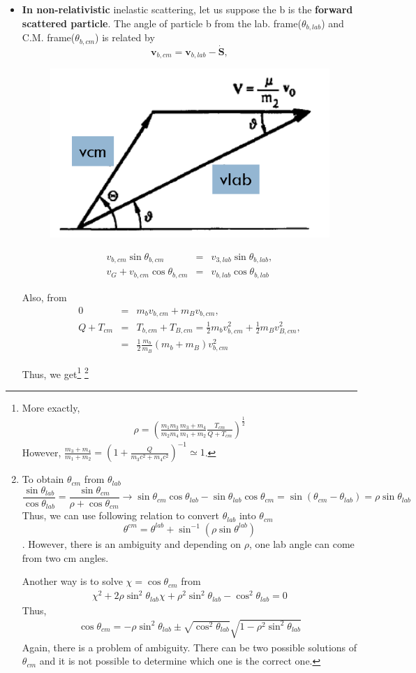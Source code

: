 \documentclass[10pt]{book}
\def\bm{\boldsymbol}
\newcommand{\bea}{\begin{eqnarray}}
\newcommand{\eea}{\end{eqnarray}}
\newcommand{\no}{\nonumber \\}
\begin{document}
\begin{itemize}
\item 
{\bf In non-relativistic} inelastic scattering, 
let us suppose the b is the {\bf forward scattered particle}. 
The angle of particle b from the lab. frame($\theta_{b,lab}$) 
and C.M. frame($\theta_{b,cm}$) is related by
$${\bm v}_{b,cm}={\bm v}_{b,lab}-\dot{\bm S}, $$
\begin{figure}
\centering
\includegraphics[width=0.5\linewidth]{labcm}
\caption{}
\label{fig:labcm}
\end{figure}

\bea 
v_{b,cm}\sin\theta_{b,cm}&=& v_{3,lab}\sin\theta_{b,lab} ,\no 
v_G+v_{b,cm}\cos\theta_{b,cm}&=&v_{b,lab}\cos\theta_{b,lab}
\eea 


Also, from
\bea 
 0&=& m_b v_{b,cm}+m_B v_{b,cm}, \no 
Q+T_{cm}&=&T_{b,cm}+T_{B,cm}=\frac{1}{2}m_b v_{b,cm}^2+\frac{1}{2}m_B v_{B,cm}^2,\no 
        &=& \frac{1}{2}\frac{m_b}{m_B}(m_b+m_B)v_{b,cm}^2
\eea 

Thus, we get\footnote{More exactly,
\bea 
\rho= \left(\frac{m_1 m_3}{m_2 m_4}\frac{m_3+m_4}{m_1+m_2}
        \frac{T_{cm}}{Q+T_{cm}}\right)^{\frac{1}{2}}
\eea 
However, $\frac{m_3+m_4}{m_1+m_2}=(1+\frac{Q}{m_3c^2+m_4c^2})^{-1}\simeq 1$.
}
\footnote{To obtain $\theta_{cm}$ from $\theta_{lab}$ 
	$$
	\frac{\sin\theta_{lab}}{\cos\theta_{lab}}=\frac{\sin\theta_{cm}}{\rho+\cos\theta_{cm}}
	\to \sin\theta_{cm}\cos\theta_{lab}-\sin\theta_{lab}\cos\theta_{cm}
	=\sin(\theta_{cm}-\theta_{lab})= 
	\rho\sin\theta_{lab} 
	$$
	Thus, we can use following relation to convert $\theta_{lab}$ into $\theta_{cm}$
	$$\theta^{cm}=\theta^{lab}+\sin^{-1}(\rho \sin\theta^{lab}) $$. 
	However, there is an ambiguity and depending on $\rho$, one lab angle can come from two cm angles. 
	
	Another way is to solve $\chi=\cos\theta_{cm}$ from 
	\bea 
	\chi^2+2\rho\sin^2\theta_{lab} \chi +\rho^2\sin^2\theta_{lab}-\cos^2\theta_{lab}=0 
	\eea 
	Thus,
	\bea 
	\cos\theta_{cm}=-\rho\sin^2\theta_{lab}\pm \sqrt{\cos^2\theta_{lab}} \sqrt{1-\rho^2\sin^2\theta_{lab}}
	\eea 
    Again, there is a problem of ambiguity. There can be two possible solutions of $\theta_{cm}$
    and it is not possible to determine which one is the correct one.
    
}
\end{itemize}
\end{document}
